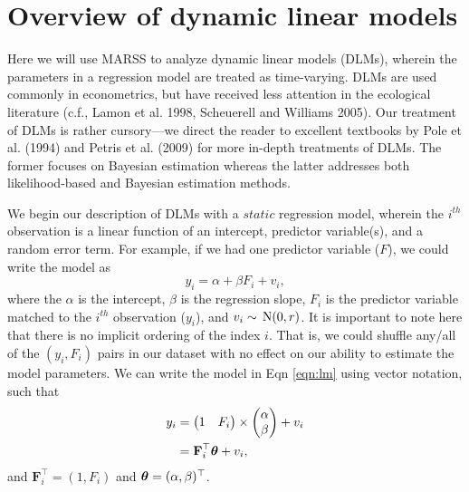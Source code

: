 \documentclass[10pt]{article}
\def\FF{\mbox{$\mathbf F$}}
\def\ttheta{\mbox{\boldmath $\theta$}}
\def\N{\,\textup{\textrm{N}}}
\begin{document}

\section{Overview of dynamic linear models}
Here we will use MARSS to analyze dynamic linear models (DLMs), wherein the parameters in a regression model are treated as time-varying. DLMs are used commonly in econometrics, but have received less attention in the ecological literature (c.f., Lamon et al. 1998, Scheuerell and Williams 2005). Our treatment of DLMs is rather cursory---we direct the reader to excellent textbooks by Pole et al. (1994) and Petris et al. (2009) for more in-depth treatments of DLMs. The former focuses on Bayesian estimation whereas the latter addresses both likelihood-based and Bayesian estimation methods.

We begin our description of DLMs with a $static$ regression model, wherein the $i^{th}$ observation is a linear function of an intercept, predictor variable(s), and a random error term. For example, if we had one predictor variable ($F$), we could write the model as
\begin{equation}\label{eqn:lm}
y_i = \alpha + \beta F_i + v_i,
\end{equation}
where the $\alpha$ is the intercept, $\beta$ is the regression slope, $F_i$ is the predictor variable matched to the $i^{th}$ observation ($y_i$), and $v_i \sim \N(0,r)$. It is important to note here that there is no implicit ordering of the index $i$. That is, we could shuffle any/all of the $(y_i, F_i)$ pairs in our dataset with no effect on our ability to estimate the model parameters. We can write the model in Eqn \ref{eqn:lm} using vector notation, such that
\begin{align}\label{eqn:lmVec}
y_i &= \begin{pmatrix}1&F_i\end{pmatrix} \times
\begin{pmatrix}\alpha\\ \beta\end{pmatrix} + v_i \nonumber\\
&= \FF_i^{\top}\ttheta + v_i,
\end{align}
and $\FF_i^{\top} = (1,F_i)$ and $\ttheta = (\alpha,\beta)^{\top}$.
\end{document}
